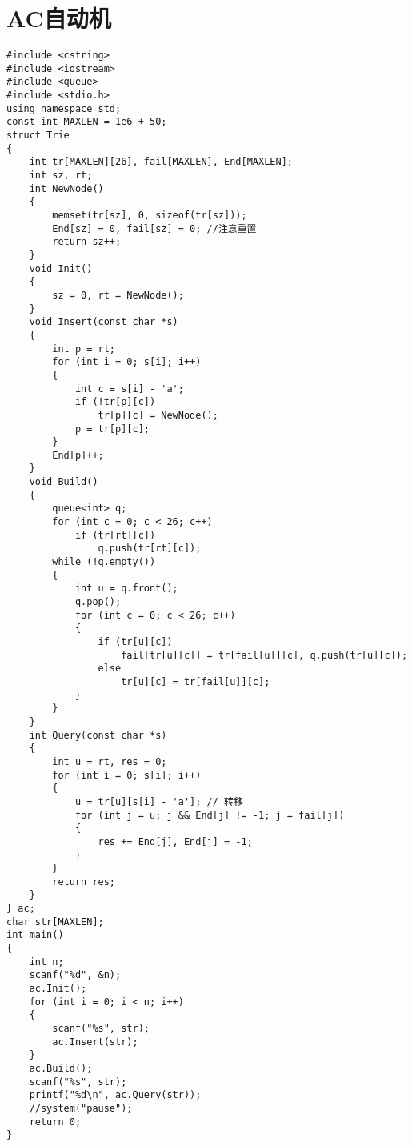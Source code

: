 \section{AC自动机}
\begin{lstlisting}
#include <cstring>
#include <iostream>
#include <queue>
#include <stdio.h>
using namespace std;
const int MAXLEN = 1e6 + 50;
struct Trie
{
    int tr[MAXLEN][26], fail[MAXLEN], End[MAXLEN];
    int sz, rt;
    int NewNode()
    {
        memset(tr[sz], 0, sizeof(tr[sz]));
        End[sz] = 0, fail[sz] = 0; //注意重置
        return sz++;
    }
    void Init()
    {
        sz = 0, rt = NewNode();
    }
    void Insert(const char *s)
    {
        int p = rt;
        for (int i = 0; s[i]; i++)
        {
            int c = s[i] - 'a';
            if (!tr[p][c])
                tr[p][c] = NewNode();
            p = tr[p][c];
        }
        End[p]++;
    }
    void Build()
    {
        queue<int> q;
        for (int c = 0; c < 26; c++)
            if (tr[rt][c])
                q.push(tr[rt][c]);
        while (!q.empty())
        {
            int u = q.front();
            q.pop();
            for (int c = 0; c < 26; c++)
            {
                if (tr[u][c])
                    fail[tr[u][c]] = tr[fail[u]][c], q.push(tr[u][c]);
                else
                    tr[u][c] = tr[fail[u]][c];
            }
        }
    }
    int Query(const char *s)
    {
        int u = rt, res = 0;
        for (int i = 0; s[i]; i++)
        {
            u = tr[u][s[i] - 'a']; // 转移
            for (int j = u; j && End[j] != -1; j = fail[j])
            {
                res += End[j], End[j] = -1;
            }
        }
        return res;
    }
} ac;
char str[MAXLEN];
int main()
{
    int n;
    scanf("%d", &n);
    ac.Init();
    for (int i = 0; i < n; i++)
    {
        scanf("%s", str);
        ac.Insert(str);
    }
    ac.Build();
    scanf("%s", str);
    printf("%d\n", ac.Query(str));
    //system("pause");
    return 0;
}
\end{lstlisting}